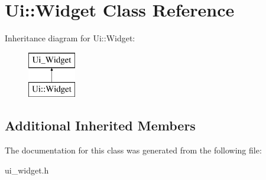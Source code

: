 \hypertarget{classUi_1_1Widget}{\section{Ui\-:\-:Widget Class Reference}
\label{classUi_1_1Widget}
}
Inheritance diagram for Ui\-:\-:Widget\-:\begin{figure}[H]
\begin{center}
\leavevmode
\includegraphics[height=2.000000cm]{classUi_1_1Widget}
\end{center}
\end{figure}
\subsection*{Additional Inherited Members}


The documentation for this class was generated from the following file\-:\begin{DoxyCompactItemize}
\item 
ui\-\_\-widget.\-h\end{DoxyCompactItemize}
